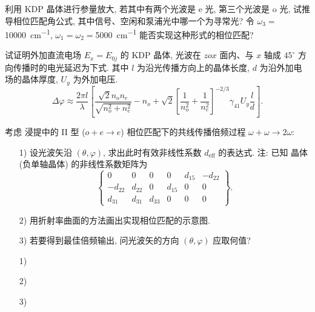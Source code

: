 \documentclass{assignment}
\begin{document}
\begin{prob}
    利用 KDP 晶体进行参量放大, 若其中有两个光波是 e 光, 第三个光波是 o 光, 试推导相位匹配角公式, 其中信号、空闲和泵浦光中哪一个为寻常光? 令 $\omega_3=$\SI{10000}{cm^{-1}}, $\omega_1=\omega_2=$\SI{5000}{cm^{-1}} 能否实现这种形式的相位匹配?
\end{prob}
\begin{sol}
    
\end{sol}

\begin{prob}
    试证明外加直流电场 $E_x=E_{0j}$ 的 KDP 晶体, 光波在 $zox$ 面内、与 $x$ 轴成 $45^{\circ}$ 方向传播时的电光延迟为下式. 其中 $l$ 为沿光传播方向上的晶体长度, $d$ 为沿外加电场的晶体厚度, $U_y$ 为外加电压.
    \[
        \Delta\varphi\approx\frac{2\pi l}{\lambda}\left[\frac{\sqrt{2}n_on_e}{\sqrt{n_o^2+n_e^2}}-n_o+\sqrt{2}\left[\frac{1}{n_o^2}+\frac{1}{n_e^2}\right]^{-2/3}\gamma_{41}U_y\frac{l}{d}\right].
    \]
\end{prob}
\begin{pf}

\end{pf}

\begin{prob}
    考虑  浸提中的 II 型 ($o+e\rightarrow e$) 相位匹配下的共线传播倍频过程 $\omega+\omega\rightarrow 2\omega$:
    \begin{itemize}
        \item[1)] 设光波矢沿 $(\theta,\varphi)$, 求出此时有效非线性系数 $d_{\text{eff}}$ 的表达式.
        注: 已知  晶体 (负单轴晶体) 的非线性系数矩阵为
        \[
            \begin{Bmatrix}
                0&0&0&0&d_{15}&-d_{22}\\
                -d_{22}&d_{22}&0&d_{15}&0&0\\
                d_{31}&d_{31}&d_{33}&0&0&0
            \end{Bmatrix}.
        \]
        \item[2)] 用折射率曲面的方法画出实现相位匹配的示意图.
        \item[3)] 若要得到最佳倍频输出, 问光波矢的方向 $(\theta,\varphi)$ 应取何值?
    \end{itemize}
\end{prob}
\begin{sol}
    \begin{itemize}
        \item[1)] 
        \item[2)] 
        \item[3)] 
    \end{itemize}
\end{sol}
\end{document}
